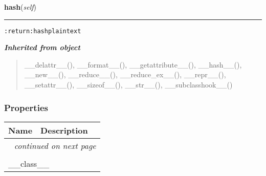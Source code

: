     \vspace{0.5ex}

\hspace{.8\funcindent}\begin{boxedminipage}{\funcwidth}

    \raggedright \textbf{hash}(\textit{self})

    \vspace{-1.5ex}

    \rule{\textwidth}{0.5\fboxrule}
\setlength{\parskip}{2ex}
\begin{alltt}

:return: hash plaintext
\end{alltt}

\setlength{\parskip}{1ex}
    \end{boxedminipage}


\large{\textbf{\textit{Inherited from object}}}

\begin{quote}
\_\_delattr\_\_(), \_\_format\_\_(), \_\_getattribute\_\_(), \_\_hash\_\_(), \_\_new\_\_(), \_\_reduce\_\_(), \_\_reduce\_ex\_\_(), \_\_repr\_\_(), \_\_setattr\_\_(), \_\_sizeof\_\_(), \_\_str\_\_(), \_\_subclasshook\_\_()
\end{quote}


  \subsubsection{Properties}

    \vspace{-1cm}
\hspace{\varindent}\begin{longtable}{|p{\varnamewidth}|p{\vardescrwidth}|l}
\cline{1-2}
\cline{1-2} \centering \textbf{Name} & \centering \textbf{Description}& \\
\cline{1-2}
\endhead\cline{1-2}\multicolumn{3}{r}{\small\textit{continued on next page}}\\\endfoot\cline{1-2}
\endlastfoot\multicolumn{2}{|l|}{\textit{Inherited from object}}\\
\multicolumn{2}{|p{\varwidth}|}{\raggedright \_\_class\_\_}\\
\cline{1-2}
\end{longtable}

